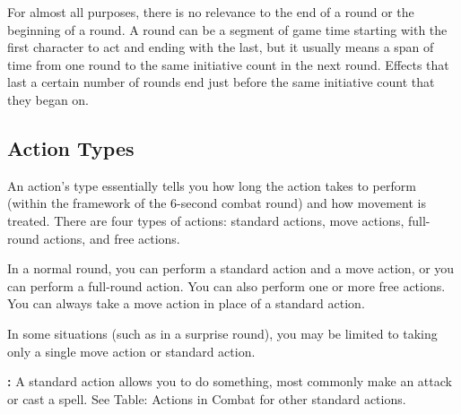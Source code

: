 For almost all purposes, there is no relevance to the end of a round or the beginning 
of a round. A round can be a segment of game time starting with the first character 
to act and ending with the last, but it usually means a span of time from one round 
to the same initiative count in the next round. Effects that last a certain number 
of rounds end just before the same initiative count that they began on.

\subsection{Action Types}

An action's type essentially tells you how long the action takes to perform (within 
the framework of the 6-second combat round) and how movement is treated. There 
are four types of actions: standard actions, move actions, full-round actions, 
and free actions.

In a normal round, you can perform a standard action and a move action, or you 
can perform a full-round action. You can also perform one or more free actions. 
You can always take a move action in place of a standard action.

In some situations (such as in a surprise round), you may be limited to taking 
only a single move action or standard action.

\textbf{:} A standard action allows you to do something, most commonly 
make an attack or cast a spell. See Table: Actions in Combat for other standard 
actions.

